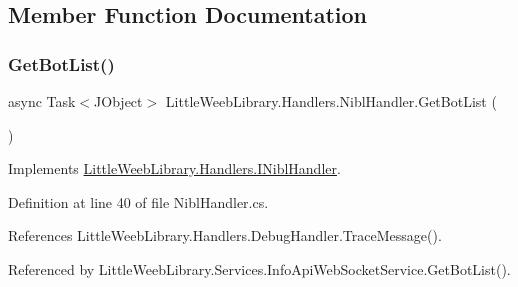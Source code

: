 \subsection{Member Function Documentation}
\mbox{\label{class_little_weeb_library_1_1_handlers_1_1_nibl_handler_aac05976a2e1a688dd187ccca513ab3cc}} 
\subsubsection{\texorpdfstring{Get\+Bot\+List()}{GetBotList()}}
{\footnotesize\ttfamily async Task$<$J\+Object$>$ Little\+Weeb\+Library.\+Handlers.\+Nibl\+Handler.\+Get\+Bot\+List (\begin{DoxyParamCaption}{ }\end{DoxyParamCaption})}



Implements \mbox{\hyperlink{interface_little_weeb_library_1_1_handlers_1_1_i_nibl_handler_ae0847d190828d9d373650626f92e83ec}{Little\+Weeb\+Library.\+Handlers.\+I\+Nibl\+Handler}}.



Definition at line 40 of file Nibl\+Handler.\+cs.



References Little\+Weeb\+Library.\+Handlers.\+Debug\+Handler.\+Trace\+Message().



Referenced by Little\+Weeb\+Library.\+Services.\+Info\+Api\+Web\+Socket\+Service.\+Get\+Bot\+List().


